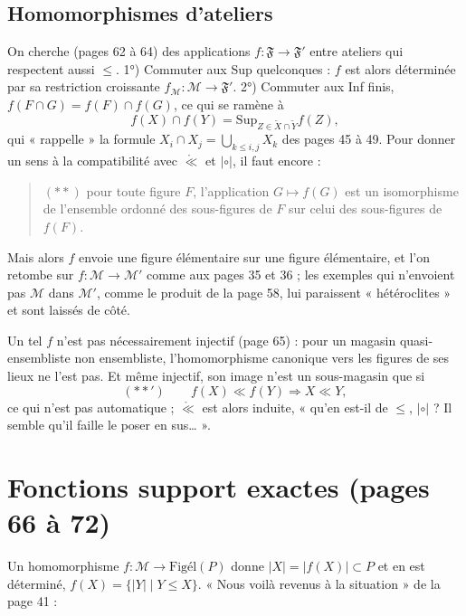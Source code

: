 \documentclass[11pt,a4paper]{article}
\begin{document}
\subsection*{Homomorphismes d'ateliers}

On cherche (pages 62 à 64) des applications $f : \mathfrak{F} \to
\mathfrak{F}'$ entre ateliers qui respectent aussi $\leq$. 1°) Commuter aux Sup
quelconques : $f$ est alors déterminée par sa restriction croissante
$f_{\mathcal{M}} : \mathcal{M} \to \mathfrak{F}'$. 2°) Commuter aux Inf finis,
$f(F \cap G) = f(F) \cap f(G)$, ce qui se ramène à
\[
f(X) \cap f(Y) = \mathrm{Sup}_{Z \in \widetilde{X} \cap \widetilde{Y}} f(Z),
\]
qui « rappelle » la formule $X_{i} \cap X_{j} = \bigcup_{k \leq i,j} X_{k}$ des
pages 45 à 49. Pour donner un sens à la compatibilité avec $\mathring{\ll}$ et
$\mathrel{|\circ|}$, il faut encore :
\begin{quote}
$(**)$ pour toute figure $F$, l'application $G \mapsto f(G)$ est un
isomorphisme de l'ensemble ordonné des sous-figures de $F$ sur celui des
sous-figures de $f(F)$.
\end{quote}
Mais alors $f$ envoie une figure élémentaire sur une figure élémentaire, et l'on
retombe sur $f : \mathcal{M} \to \mathcal{M}'$ comme aux pages 35 et 36 ; les
exemples qui n'envoient pas $\mathcal{M}$ dans $\mathcal{M}'$, comme le produit
de la page 58, lui paraissent « hétéroclites » et sont laissés de côté.

Un tel $f$ n'est pas nécessairement injectif (page 65) : pour un magasin
quasi-ensembliste non ensembliste, l'homomorphisme canonique vers les figures
de ses lieux ne l'est pas. Et même injectif, son image n'est un sous-magasin que
si
\[
(**') \qquad f(X) \ll f(Y) \Longrightarrow X \ll Y ,
\]
ce qui n'est pas automatique ; $\mathring{\ll}$ est alors induite, « qu'en
est-il de $\leq$, $\mathrel{|\circ|}$ ? Il semble qu'il faille le poser en
sus… ».

\section*{Fonctions support exactes (pages 66 à 72)}

Un homomorphisme $f : \mathcal{M} \to \mathrm{Figél}(P)$ donne $|X| = |f(X)|
\subset P$ et en est déterminé, $f(X) = \{|Y| \mid Y \leq X\}$. « Nous voilà
revenus à la situation » de la page 41 :
\end{document}
